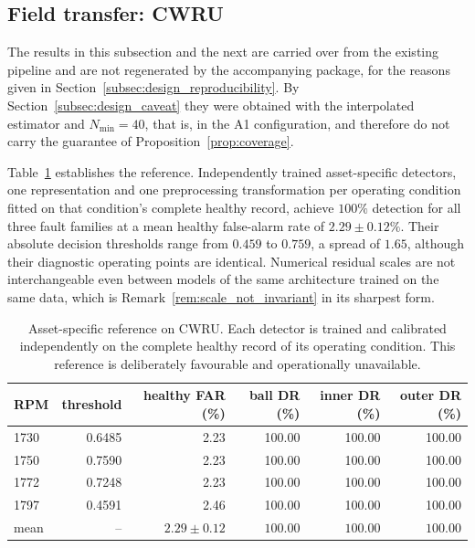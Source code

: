 \documentclass[a4paper]{cas-sc}
\begin{document}
\subsection{Field transfer: CWRU}
\label{subsec:results_cwru}

The results in this subsection and the next are carried over from the existing
pipeline and are not regenerated by the accompanying package, for the reasons
given in Section~\ref{subsec:design_reproducibility}. By
Section~\ref{subsec:design_caveat} they were obtained with the interpolated
estimator and \(N_{\min}=40\), that is, in the A1 configuration, and therefore
do not carry the guarantee of Proposition~\ref{prop:coverage}.

Table~\ref{tab:cwru_oracle} establishes the reference. Independently trained
asset-specific detectors, one representation and one preprocessing
transformation per operating condition fitted on that condition's complete
healthy record, achieve \(100\%\) detection for all three fault families at a
mean healthy false-alarm rate of \(2.29\pm 0.12\%\). Their absolute decision
thresholds range from \(0.459\) to \(0.759\), a spread of \(1.65\), although
their diagnostic operating points are identical. Numerical residual scales are
not interchangeable even between models of the same architecture trained on
the same data, which is
Remark~\ref{rem:scale_not_invariant} in its sharpest form.

\begin{table}[!ht]
\centering
\caption{Asset-specific reference on CWRU. Each detector is trained and
calibrated independently on the complete healthy record of its operating
condition. This reference is deliberately favourable and operationally
unavailable.}
\label{tab:cwru_oracle}
\begin{tabular}{lrrrrr}
\toprule
RPM & threshold & healthy FAR (\%) & ball DR (\%) & inner DR (\%) & outer DR (\%) \\
\midrule
1730 & 0.6485 & 2.23 & 100.00 & 100.00 & 100.00 \\
1750 & 0.7590 & 2.23 & 100.00 & 100.00 & 100.00 \\
1772 & 0.7248 & 2.23 & 100.00 & 100.00 & 100.00 \\
1797 & 0.4591 & 2.46 & 100.00 & 100.00 & 100.00 \\
\midrule
mean & --     & $2.29\pm0.12$ & $100.00$ & $100.00$ & $100.00$ \\
\bottomrule
\end{tabular}
\end{table}
\end{document}
